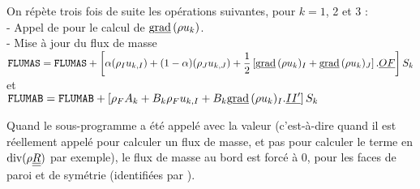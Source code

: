 On r\'ep\`ete trois fois de suite les op\'erations suivantes, pour $k=1$, 2 et 3
:\\
- Appel de  pour le calcul de $\text{g}\underline{\text{rad}}\ \!(\rho u_k)$.\\
- Mise \`a jour du flux de masse\\
$\displaystyle \text{\texttt{FLUMAS}}=\text{\texttt{FLUMAS}} + \left[
\alpha(\rho_I u_{k,I})+(1-\alpha)(\rho_J u_{k,J})
+\frac{1}{2}\left[\text{g}\underline{\text{rad}}\ \!(\rho u_k)_I+\text{g}\underline{\text{rad}}\ \!(\rho u_k)_J\right]
.\underline{OF}\right]S_k$\\
et\\
$\displaystyle \text{\texttt{FLUMAB}}=\text{\texttt{FLUMAB}}+\left[
\rho_F A_k + B_k\rho_Fu_{k,I}
+B_k\text{g}\underline{\text{rad}}\ \!(\rho u_k)_I.\underline{II^\prime}\right]S_k$


Quand le sous-programme a \'et\'e appel\'e avec la valeur 
(c'est-\`a-dire quand il est r\'eellement appel\'e pour calculer un flux de
masse, et pas pour calculer le terme en $\text{div}(\rho\underline{\underline{R}})$ par exemple), le flux
de masse au bord  est forc\'e \`a 0, pour les faces de paroi et de
sym\'etrie (identifi\'ees par ).
